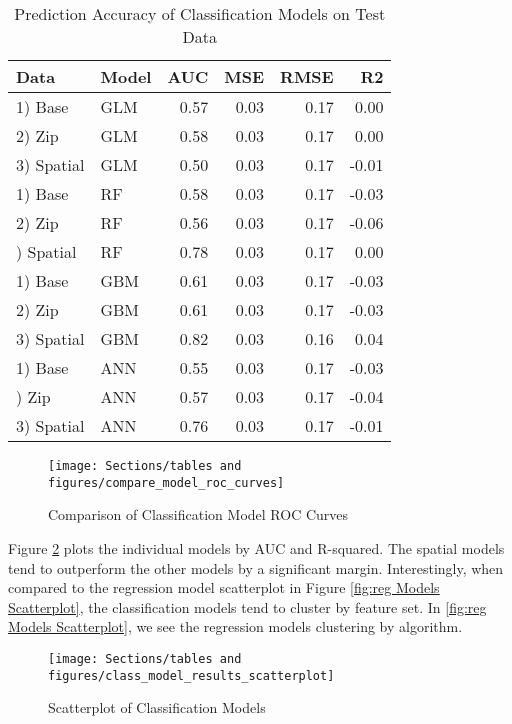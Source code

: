 \documentclass[12pt,]{article}
\begin{document}
\begin{table}

\caption{\label{tab:Class Model Compare}\label{tab:ClassModelTable} Prediction Accuracy of Classification Models on Test Data}
\centering
\begin{tabular}[t]{llrrrr}
\toprule
Data & Model & AUC & MSE & RMSE & R2\\
\midrule
1) Base & GLM & 0.57 & 0.03 & 0.17 & 0.00\\
2) Zip & GLM & 0.58 & 0.03 & 0.17 & 0.00\\
3) Spatial & GLM & 0.50 & 0.03 & 0.17 & -0.01\\
1) Base & RF & 0.58 & 0.03 & 0.17 & -0.03\\
2) Zip & RF & 0.56 & 0.03 & 0.17 & -0.06\\
\addlinespace
3) Spatial & RF & 0.78 & 0.03 & 0.17 & 0.00\\
1) Base & GBM & 0.61 & 0.03 & 0.17 & -0.03\\
2) Zip & GBM & 0.61 & 0.03 & 0.17 & -0.03\\
3) Spatial & GBM & 0.82 & 0.03 & 0.16 & 0.04\\
1) Base & ANN & 0.55 & 0.03 & 0.17 & -0.03\\
\addlinespace
2) Zip & ANN & 0.57 & 0.03 & 0.17 & -0.04\\
3) Spatial & ANN & 0.76 & 0.03 & 0.17 & -0.01\\
\bottomrule
\end{tabular}
\end{table}

\begin{figure}[H]
\texttt{[image: Sections/tables and figures/compare\_model\_roc\_curves]} \caption{Comparison of Classification Model ROC Curves}\label{fig:Model AUC Comparrison}
\end{figure}

\noindent Figure \ref{fig:Class Models Scatterplot} plots the individual
models by AUC and R-squared. The spatial models tend to outperform the
other models by a significant margin. Interestingly, when compared to
the regression model scatterplot in Figure
\ref{fig:reg Models Scatterplot}, the classification models tend to
cluster by feature set. In \ref{fig:reg Models Scatterplot}, we see the
regression models clustering by algorithm.

\begin{figure}[H]
\texttt{[image: Sections/tables and figures/class\_model\_results\_scatterplot]} \caption{Scatterplot of Classification Models}\label{fig:Class Models Scatterplot}
\end{figure}
\end{document}

